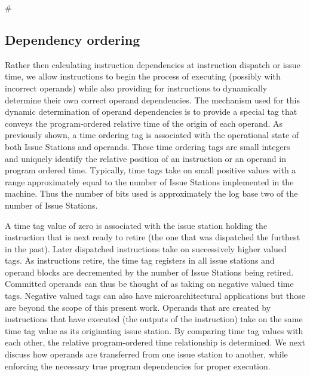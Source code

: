 #\documentclass[10pt,dvips]{article}
\begin{document}
\subsection{Dependency ordering}
%
Rather then calculating instruction dependencies at instruction
dispatch or issue time, we allow instructions to begin
the process of executing (possibly with incorrect operands)
while also providing for instructions to
dynamically determine their own correct
operand dependencies.
The mechanism used for this dynamic determination of
operand dependencies is to provide a special tag that
conveys the program-ordered relative time of the origin of
each operand.
As previously shown,
a time ordering tag is associated
with the operational state of both Issue Stations and operands.
These time ordering tags are small
integers and uniquely identify the relative position of an instruction
or an operand in program ordered time.
Typically, time tags take on small positive values with
a range approximately equal to the 
number of Issue Stations implemented in
the machine.  Thus the number of bits used is approximately
the log base two of the number of Issue Stations.

A time tag value of zero is associated with the
issue station holding the instruction that is next ready
to retire (the one that was dispatched the furthest in the past).
Later dispatched instructions take on successively higher
valued tags.
As instructions retire, the time tag registers in all
issue stations and operand blocks are decremented by the
number of Issue Stations being retired.
Committed operands can thus be thought of as taking on
negative valued time tags.  Negative valued tags can also have
microarchitectural applications but those are beyond the
scope of this present work.
Operands that are created by instructions that have executed
(the outputs of the instruction) take on
the same time tag value as its originating issue station.  
By comparing time tag values with each other, the relative
program-ordered time relationship is determined.
We next discuss
how operands are transferred from one
issue station to another, while enforcing the necessary
true program dependencies for proper execution.
%
%
\end{document}
